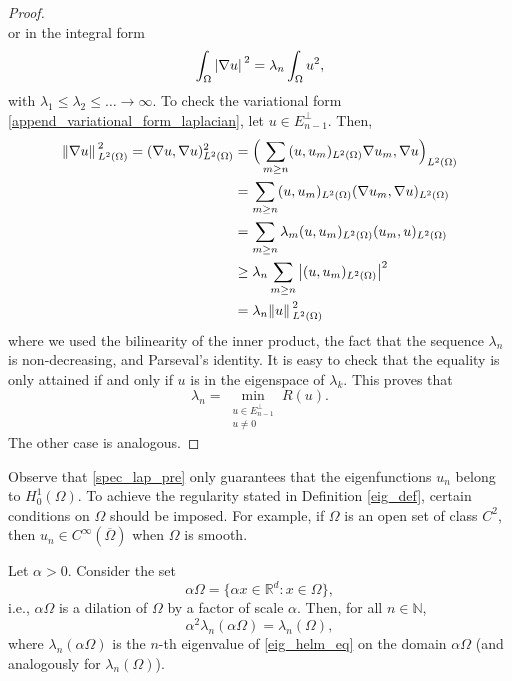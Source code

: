 \begin{proof}
\[    \]
    or in the integral form
    \[
        \int_\Omega \abs*{\nabla u}^2 = \lambda_n \int_\Omega u^2,
    \]
    with \(\lambda_1 \leq \lambda_2 \leq \dots \rightarrow \infty\). To check the variational form \eqref{append_variational_form_laplacian}, let \(u \in E_{n-1}^\perp\). Then,
    \begin{align*}
        \norm*{\nabla u}_{L^2(\Omega)}^2 = (\nabla u, \nabla u)_{L^2(\Omega)}^2 &= \Big(\sum_{m\geq n} (u, u_m)_{L^2(\Omega)} \nabla u_m, \nabla u \Big)_{L^2(\Omega)}\\
        &=\sum_{m\geq n} (u, u_m)_{L^2(\Omega)} (\nabla u_m, \nabla u)_{L^2(\Omega)}\\
        &=\sum_{m\geq n} \lambda_m (u, u_m)_{L^2(\Omega)} (u_m, u)_{L^2(\Omega)}\\
        & \geq \lambda_n \sum_{m\geq n} \abs{(u, u_m)_{L^2(\Omega)}}^2\\
        &= \lambda_n \norm*{u}_{L^2(\Omega)}^2
    \end{align*}
    where we used the bilinearity of the inner product, the fact that the sequence \(\lambda_n\) is non-decreasing, and Parseval's identity. It is easy to check that the equality is only attained if and only if \(u\) is in the eigenspace of \(\lambda_k\). This proves that
    \[
        \lambda_n = \min_{\substack{u \in E^\perp_{n-1} \\ u \neq 0}} R(u). 
    \]
    The other case is analogous.
\end{proof}
\begin{remark}
    Observe that \eqref{spec_lap_pre} only guarantees that the eigenfunctions \(u_n\) belong to \(H^1_0(\Omega)\). To achieve the regularity stated in Definition \eqref{eig_def}, certain conditions on \(\Omega\) should be imposed. For example, if \(\Omega\) is an open set of class \(C^2\), then \(u_n \in C^\infty(\overline{\Omega})\) when \(\Omega\) is smooth.
\end{remark}

\begin{corollary}[Homogeneity]\label{lap_homo}
    Let \(\alpha > 0\). Consider the set
    \[
        \alpha \Omega = \{\alpha x \in \mathbb{R}^d: x \in \Omega\},
    \]
    i.e., \(\alpha \Omega\) is a dilation of \(\Omega\) by a factor of scale \(\alpha\).  
    Then, for all \(n \in \mathbb{N}\),
    \[
        \alpha^2 \lambda_n(\alpha \Omega) = \lambda_n(\Omega),
    \]
    where \(\lambda_n(\alpha \Omega)\) is the \(n\)-th eigenvalue of \eqref{eig_helm_eq} on the domain \(\alpha \Omega\) (and analogously for \(\lambda_n(\Omega)\)).
\end{corollary}

